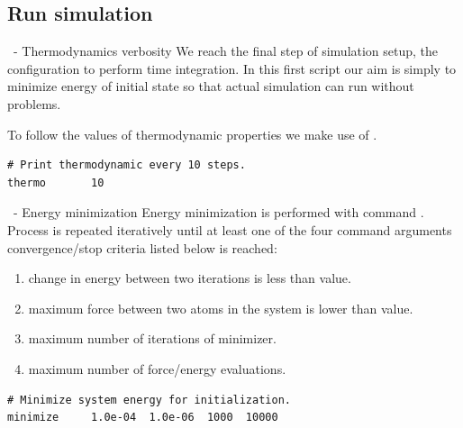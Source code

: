 \subsection{Run simulation}

\begin{frame}[fragile]{\secname}{\subsecname\ - Thermodynamics verbosity}
We reach the final step of simulation setup, the configuration to perform time integration. In this first script our aim is simply to minimize energy of initial state so that actual simulation can run without problems.

\vspace{0.5cm}

To follow the values of thermodynamic properties we make use of .

\vspace{0.5cm}

\begin{lstlisting}[language=LAMMPS,basicstyle=\small]
# Print thermodynamic every 10 steps.
thermo       10
\end{lstlisting}
\end{frame}

\begin{frame}[fragile]{\secname}{\subsecname\ - Energy minimization}
Energy minimization is performed with command . Process is repeated iteratively until at least one of the four command arguments convergence/stop criteria listed below is reached:

\vspace{0.5cm}

\begin{enumerate}
\item change in energy between two iterations is less than value.
\item maximum force between two atoms in the system is lower than value.
\item maximum number of iterations of minimizer.
\item maximum number of force/energy evaluations.
\end{enumerate}
\vspace{0.5cm}

\begin{lstlisting}[language=LAMMPS,basicstyle=\small]
# Minimize system energy for initialization.
minimize     1.0e-04  1.0e-06  1000  10000
\end{lstlisting}
\end{frame}


